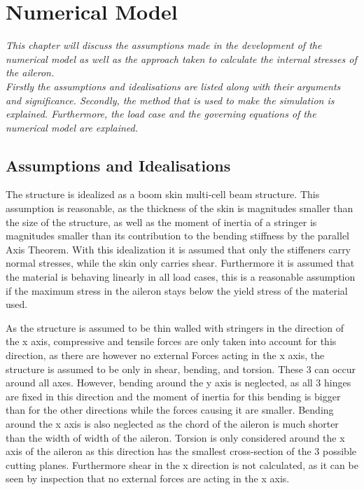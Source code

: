 \section{Numerical Model}
\label{sec:numerical_model}
\textit{This chapter will discuss the assumptions made in the development of the numerical model as well as the approach taken to calculate the internal stresses of the aileron.\\
Firstly the assumptions and idealisations are listed along with their arguments and significance. Secondly, the method that is used to make the simulation is explained. Furthermore, the load case and the governing equations of the numerical model are explained.}

\subsection{Assumptions and Idealisations}
\label{subsec:assumptions_numerical}
The structure is idealized as a boom skin multi-cell beam structure. This assumption is reasonable, as the thickness of the skin is magnitudes smaller than the size of the structure, as well as the moment of inertia of a stringer is magnitudes smaller than its contribution to the bending stiffness by the parallel Axis Theorem. With this idealization it is assumed that only the stiffeners carry normal stresses, while the skin only carries shear. Furthermore it is assumed that the material is behaving linearly in all load cases, this is a reasonable assumption if the maximum stress in the aileron stays below the yield stress of the material used.\par

As the structure is assumed to be thin walled with stringers in the direction of the x axis, compressive and tensile forces are only taken into account for this direction, as there are however no external Forces acting in the x axis, the structure is assumed to be only in shear, bending, and torsion. These 3 can occur around all axes. However, bending around the y axis is neglected, as all 3 hinges are fixed in this direction and the moment of inertia for this bending is bigger than for the other directions while the forces causing it are smaller. Bending around the x axis is also neglected as the chord of the aileron is much shorter than the width of width of the aileron. Torsion is only considered around the x axis of the aileron as this direction has the smallest cross-section of the 3 possible cutting planes. Furthermore shear in the x direction is not calculated, as it can be seen by inspection that no external forces are acting in the x axis.

